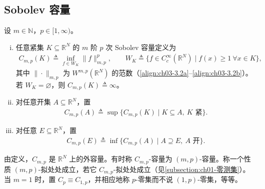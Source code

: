 \documentclass[../../main.tex]{subfiles}%
\begin{document}
\subsection{Sobolev 容量}\label{subsection:ch03-Sobolev容量}

\begin{definition}\label{definition:ch03-Sobolev容量}
设 $m\in\mathbb{N}$，$p\in[1,\infty)$。
\begin{enumerate}[(i)]
\item 任意紧集 $K\subseteq\mathbb{R}^N$ 的 $m$ 阶 $p$ 次 Sobolev 容量定义为
\begin{align}
C_{m,p}(K)\triangleq \inf_{f\in W_K}\|f\|_{m,p}^p,\qquad
W_K\triangleq \{f\in C^\infty_c(\mathbb{R}^N)\mid f(x)\geqslant1\ \forall x\in K\},\label{align:ch03-3.58a}
\end{align}
其中 $\|\cdot\|_{m,p}$ 为 $W^{m,p}(\mathbb{R}^N)$ 的范数（\eqref{align:ch03-3.2a}--\eqref{align:ch03-3.2b}）。若 $W_K=\varnothing $，则 $C_{m,p}(K)\triangleq \infty$。
\item 对任意开集 $A\subseteq\mathbb{R}^N$，置
\begin{align}
C_{m,p}(A)\triangleq \sup\{C_{m,p}(K)\mid K\subseteq A,\ K\text{ 紧}\}.\label{align:ch03-3.58b}
\end{align}
\item 对任意 $E\subseteq\mathbb{R}^N$，置
\begin{align}
C_{m,p}(E)\triangleq \inf\{C_{m,p}(A)\mid A\supseteq E,\ A\text{ 开}\}.\label{align:ch03-3.58c}
\end{align}
\end{enumerate}
\end{definition}

由定义，$C_{m,p}$ 是 $\mathbb{R}^N$ 上的外容量。有时称 $C_{m,p}$-容量为 $(m,p)$-容量。称一个性质 $(m,p)$-拟处处成立，若它 $C_{m,p}$-拟处处成立（见\cref{subsection:ch01-零测集}）。当 $m=1$ 时，置 $C_p\equiv C_{1,p}$，并相应地称 $p$-零集而不说 $(1,p)$-零集，等等。
\end{document}
